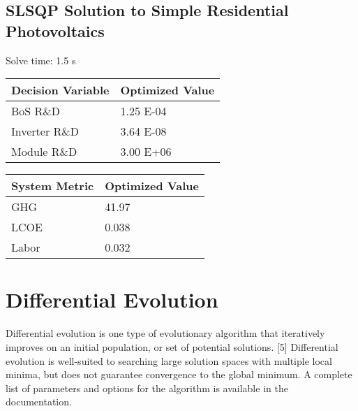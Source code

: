 \documentclass[letterpaper,10pt,english]{sphinxmanual}
\begin{document}
\subsection{SLSQP Solution to Simple Residential Photovoltaics}
\label{\detokenize{optimizers:slsqp-solution-to-simple-residential-photovoltaics}}
Solve time: 1.5 s


\begin{savenotes}\sphinxattablestart
\centering
{}
\sphinxthecaptionisattop
{}\label{\detokenize{optimizers:table-2}}\label{\detokenize{optimizers:tbl-slsqpvars}}
\sphinxaftertopcaption
\begin{tabulary}{\linewidth}[t]{|T|T|}
\hline
\sphinxstyletheadfamily 
Decision Variable
&\sphinxstyletheadfamily 
Optimized Value
\\
\hline
BoS R\&D
&
1.25 E-04
\\
\hline
Inverter R\&D
&
3.64 E-08
\\
\hline
Module R\&D
&
3.00 E+06
\\
\hline
\end{tabulary}
\par
\sphinxattableend\end{savenotes}


\begin{savenotes}\sphinxattablestart
\centering
{}
\sphinxthecaptionisattop
{}\label{\detokenize{optimizers:table-3}}\label{\detokenize{optimizers:tbl-slsqpmetrics}}
\sphinxaftertopcaption
\begin{tabulary}{\linewidth}[t]{|T|T|}
\hline
\sphinxstyletheadfamily 
System Metric
&\sphinxstyletheadfamily 
Optimized Value
\\
\hline
GHG
&
41.97
\\
\hline
LCOE
&
0.038
\\
\hline
Labor
&
0.032
\\
\hline
\end{tabulary}
\par
\sphinxattableend\end{savenotes}


\section{Differential Evolution}
\label{\detokenize{optimizers:differential-evolution}}
Differential evolution is one type of evolutionary algorithm that iteratively improves on an initial population, or set of potential solutions. {[}5{]} Differential evolution is well-suited to searching large solution spaces with multiple local minima, but does not guarantee convergence to the global minimum. A complete list of parameters and options for the  algorithm is available in the  documentation.
\end{document}
